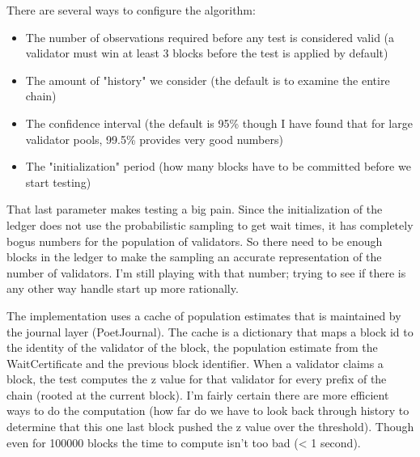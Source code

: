 There are several ways to configure the algorithm: 

\begin{itemize}
\item The number of observations required before any test is considered
  valid (a validator must win at least 3 blocks before the test is
  applied by default)

\item The amount of "history" we consider (the default is to examine the
  entire chain)

\item The confidence interval (the default is 95\% though I have found
  that for large validator pools, 99.5\% provides very good numbers)

\item The "initialization" period (how many blocks have to be committed
  before we start testing)
\end{itemize}

That last parameter makes testing a big pain. Since the initialization
of the ledger does not use the probabilistic sampling to get wait times,
it has completely bogus numbers for the population of validators. So
there need to be enough blocks in the ledger to make the sampling an
accurate representation of the number of validators. I'm still playing
with that number; trying to see if there is any other way handle start
up more rationally.

The implementation uses a cache of population estimates that is
maintained by the journal layer (PoetJournal). The cache is a dictionary
that maps a block id to the identity of the validator of the block, the
population estimate from the WaitCertificate and the previous block
identifier. When a validator claims a block, the test computes the z
value for that validator for every prefix of the chain (rooted at the
current block). I'm fairly certain there are more efficient ways to do
the computation (how far do we have to look back through history to
determine that this one last block pushed the z value over the
threshold). Though even for 100000 blocks the time to compute isn't too
bad (< 1 second).


